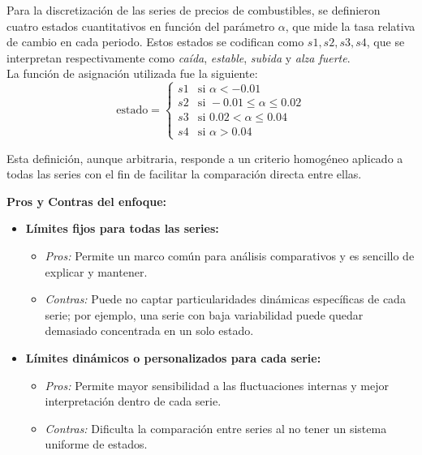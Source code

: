 \begin{examplex}

\label{ex:estados_combustibles_discusion}

Para la discretización de las series de precios de combustibles, se definieron cuatro estados cuantitativos en función del parámetro \(\alpha\), que mide la tasa relativa de cambio en cada periodo. Estos estados se codifican como \(s1, s2, s3, s4\), que se interpretan respectivamente como \emph{caída}, \emph{estable}, \emph{subida} y \emph{alza fuerte}.\\

La función de asignación utilizada fue la siguiente:
\[
\text{estado} =
\begin{cases}
s1 & \text{si } \alpha < -0.01 \\
s2 & \text{si } -0.01 \leq \alpha \leq 0.02 \\
s3 & \text{si } 0.02 < \alpha \leq 0.04 \\
s4 & \text{si } \alpha > 0.04
\end{cases}
\]

Esta definición, aunque arbitraria, responde a un criterio homogéneo aplicado a todas las series con el fin de facilitar la comparación directa entre ellas. 

\bigskip
\noindent\textbf{Pros y Contras del enfoque:}

\begin{itemize}
    \item \textbf{Límites fijos para todas las series:}
    \begin{itemize}
        \item \textit{Pros:} Permite un marco común para análisis comparativos y es sencillo de explicar y mantener.
        \item \textit{Contras:} Puede no captar particularidades dinámicas específicas de cada serie; por ejemplo, una serie con baja variabilidad puede quedar demasiado concentrada en un solo estado.
    \end{itemize}
    \item \textbf{Límites dinámicos o personalizados para cada serie:}
    \begin{itemize}
        \item \textit{Pros:} Permite mayor sensibilidad a las fluctuaciones internas y mejor interpretación dentro de cada serie.
        \item \textit{Contras:} Dificulta la comparación entre series al no tener un sistema uniforme de estados.
    \end{itemize}
\end{itemize}


\end{examplex}
